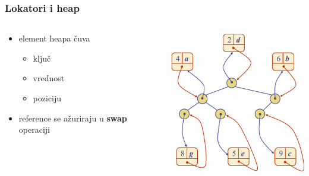 \documentclass[compress,aspectratio=169]{beamer}
\begin{document}
\begin{frame}[fragile]
  \frametitle{Lokatori i heap}
  \begin{columns}
    \begin{column}[c]{5cm}
      \begin{itemize}
        \item element heapa čuva
        \begin{itemize}
          \item ključ
          \item vrednost
          \item poziciju 
        \end{itemize}
        \item reference se ažuriraju u \textbf{swap} operaciji
      \end{itemize}
    \end{column}
    \begin{column}[c]{6cm}
      \begin{center}
        \includegraphics[width=6cm]{asp-09-pic20.png}
      \end{center}
    \end{column}
  \end{columns}
\end{frame}
\end{document}
